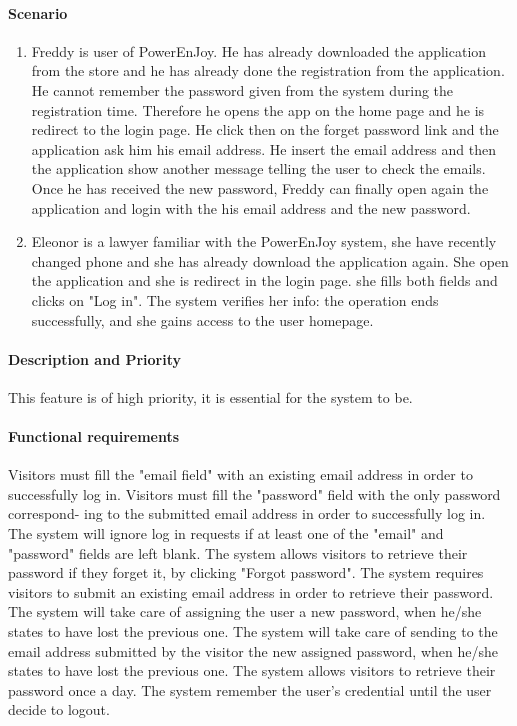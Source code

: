 \paragraph{Scenario}
\begin {enumerate}
\item Freddy is user of PowerEnJoy. He has already downloaded the application from the store and he has already done the registration from the application. He cannot remember the password given from the system during the registration time. Therefore he opens the app on the home page and he is redirect to the login page. He click then on the forget password link and the application ask him his email address. He insert the email address and then the application show another message telling the user to check the emails. Once he has received the new password, Freddy can finally open again the application and login with the his email address and the new password.
\item Eleonor is a lawyer familiar with the PowerEnJoy system, she have recently changed phone and she has already download the application again. She open the application and she is redirect in the login page. she fills both fields and clicks on "Log in". The system verifies her info: the operation ends successfully, and she gains access to the user homepage.
\end{enumerate}
\paragraph{Description and Priority}
This feature is of high priority, it is essential for the system to be.
\paragraph{Functional requirements }
\begin{itemize}
	 Visitors must fill the "email field" with an existing email address in order to successfully log in.
	 Visitors must fill the "password" field with the only password correspond- ing to the submitted email address in order to successfully log in.
	 The system will ignore log in requests if at least one of the "email" and "password" fields are left blank.
	 The system allows visitors to retrieve their password if they forget it, by clicking "Forgot password".
	 The system requires visitors to submit an existing email address in order to retrieve their password.
	 The system will take care of assigning the user a new password, when he/she states to have lost the previous one.
	 The system will take care of sending to the email address submitted by the visitor the new assigned password, when he/she states to have lost the previous one.
	 The system allows visitors to retrieve their password once a day.
	 The system remember the user's credential until the user decide to logout.
\end{itemize}
\newpage

